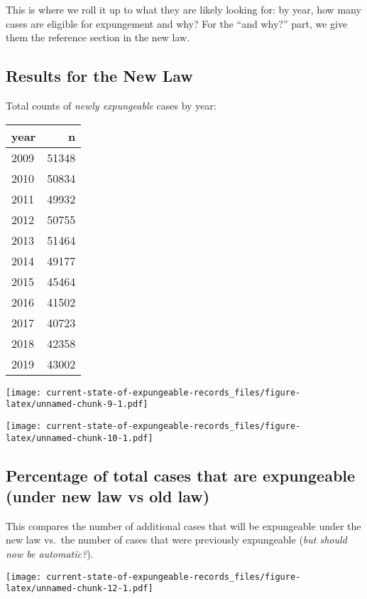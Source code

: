 \documentclass[
]{article}
\begin{document}
This is where we roll it up to what they are likely looking for: by
year, how many cases are eligible for expungement and why? For the ``and
why?'' part, we give them the reference section in the new law.

\hypertarget{results-for-the-new-law}{%
\subsection{Results for the New Law}\label{results-for-the-new-law}}

Total counts of \emph{newly expungeable} cases by year:

\begin{longtable}[]{@{}lr@{}}
\toprule
year & n \\
\midrule
\endhead
2009 & 51348 \\
2010 & 50834 \\
2011 & 49932 \\
2012 & 50755 \\
2013 & 51464 \\
2014 & 49177 \\
2015 & 45464 \\
2016 & 41502 \\
2017 & 40723 \\
2018 & 42358 \\
2019 & 43002 \\
\bottomrule
\end{longtable}

\texttt{[image: current-state-of-expungeable-records\_files/figure-latex/unnamed-chunk-9-1.pdf]}

\texttt{[image: current-state-of-expungeable-records\_files/figure-latex/unnamed-chunk-10-1.pdf]}

\hypertarget{percentage-of-total-cases-that-are-expungeable-under-new-law-vs-old-law}{%
\subsection{Percentage of total cases that are expungeable (under new
law vs old
law)}\label{percentage-of-total-cases-that-are-expungeable-under-new-law-vs-old-law}}

This compares the number of additional cases that will be expungeable
under the new law vs.~the number of cases that were previously
expungeable (\emph{but should now be automatic?}).

\texttt{[image: current-state-of-expungeable-records\_files/figure-latex/unnamed-chunk-12-1.pdf]}
\end{document}
